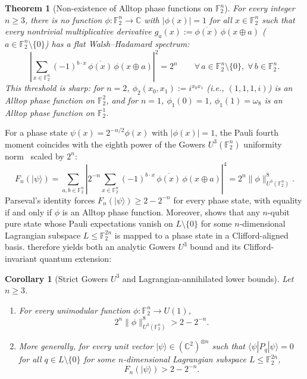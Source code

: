 \documentclass[11pt,a4paper]{article}
\theoremstyle{plain}
\newtheorem{maintheorem}{Theorem}
\newtheorem{maincorollary}{Corollary}
\theoremstyle{definition}
\theoremstyle{remark}
\newcommand{\C}{\mathbb{C}}
\newcommand{\F}{\mathbb{F}}
\newcommand{\Uone}{U(1)}
\newcommand{\ket}[1]{|#1\rangle}
\newcommand{\expval}[2]{\langle#1|#2|#1\rangle}
\newcommand{\abs}[1]{\lvert#1\rvert}
\newcommand{\norm}[1]{\lVert#1\rVert}
\numberwithin{equation}{section}
\begin{document}
\begin{maintheorem}[Non-existence of Alltop phase functions on $\F_2^n$]\label{thm:no-alltop}
For every integer $n \ge 3$, there is no function $\phi : \F_2^n \to \C$ with $\abs{\phi(x)} = 1$ for all $x \in \F_2^n$ such that every nontrivial multiplicative derivative $g_a(x) := \overline{\phi(x)}\,\phi(x \oplus a)$ ($a \in \F_2^n \setminus \{0\}$) has a flat Walsh--Hadamard spectrum:
\begin{equation}\label{eq:alltop-cond}
  \left\lvert \sum_{x \in \F_2^n} (-1)^{b \cdot x}\, \overline{\phi(x)}\,\phi(x \oplus a) \right\rvert^2 = 2^n
  \qquad \forall\, a \in \F_2^n \setminus \{0\},\; \forall\, b \in \F_2^n.
\end{equation}
This threshold is sharp: for $n = 2$, $\phi_2(x_0, x_1) := i^{x_0 x_1}$ (i.e., $(1, 1, 1, i)$) is an Alltop phase function on $\F_2^2$, and for $n = 1$, $\phi_1(0) = 1$, $\phi_1(1) = \omega_8$ is an Alltop phase function on $\F_2^1$.
\end{maintheorem}

For a phase state $\psi(x) = 2^{-n/2}\phi(x)$ with $\abs{\phi(x)} = 1$, the Pauli fourth moment coincides with the eighth power of the Gowers $U^3(\F_2^n)$ uniformity norm~\cite{gowers2001new} scaled by $2^n$:
\[
  F_n(\ket{\psi}) = \sum_{a, b \in \F_2^n} \left\lvert 2^{-n} \sum_{x \in \F_2^n} (-1)^{b \cdot x}\,\overline{\phi(x)}\,\phi(x \oplus a) \right\rvert^4 = 2^n \norm{\phi}_{U^3(\F_2^n)}^8.
\]
Parseval's identity forces $F_n(\ket{\psi}) \ge 2 - 2^{-n}$ for every phase state, with equality if and only if $\phi$ is an Alltop phase function. Moreover,  shows that any $n$-qubit pure state whose Pauli expectations vanish on $L \setminus \{0\}$ for some $n$-dimensional Lagrangian subspace $L \le \F_2^{2n}$ is mapped to a phase state in a Clifford-aligned basis.  therefore yields both an analytic Gowers $U^3$ bound and its Clifford-invariant quantum extension:

\begin{maincorollary}[Strict Gowers $U^3$ and Lagrangian-annihilated lower bounds]\label{cor:gowers}
Let $n \ge 3$.
\begin{enumerate}[label=(\alph*),leftmargin=2em]
  \item For every unimodular function $\phi : \F_2^n \to \Uone$,
  \begin{equation}\label{eq:gowers-strict}
    2^n \norm{\phi}_{U^3(\F_2^n)}^8 > 2 - 2^{-n}.
  \end{equation}
  \item More generally, for every unit vector $\ket{\psi} \in (\C^2)^{\otimes n}$ such that $\expval{\psi}{P_q} = 0$ for all $q \in L \setminus \{0\}$ for some $n$-dimensional Lagrangian subspace $L \le \F_2^{2n}$,
  \[
    F_n(\ket{\psi}) > 2 - 2^{-n}.
  \]
\end{enumerate}
\end{maincorollary}
\end{document}

